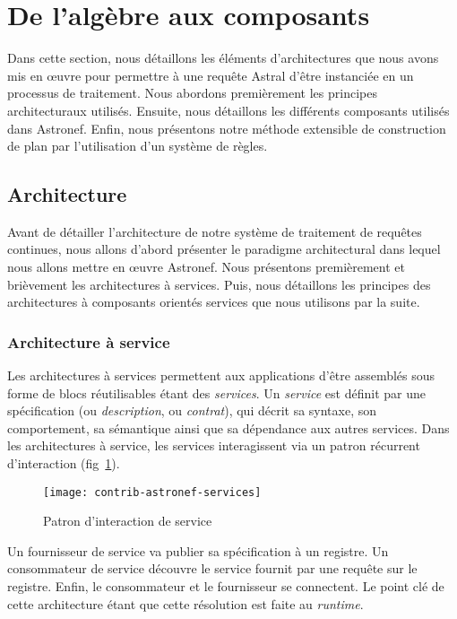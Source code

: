 \section{De l'algèbre aux composants}\label{sec:contrib:astronef:architecture}
Dans cette section, nous détaillons les éléments d'architectures que nous avons mis en œuvre pour permettre à une requête Astral d'être instanciée en un processus de traitement. Nous abordons premièrement les principes architecturaux utilisés. Ensuite, nous détaillons les différents composants utilisés dans Astronef. Enfin, nous présentons notre méthode extensible de construction de plan par l'utilisation d'un système de règles.
\subsection{Architecture}
Avant de détailler l'architecture de notre système de traitement de requêtes continues, nous allons d'abord présenter le paradigme architectural dans lequel nous allons mettre en œuvre Astronef. Nous présentons premièrement et brièvement les architectures à services. Puis, nous détaillons les principes des architectures à composants orientés services que nous utilisons par la suite.
\subsubsection{Architecture à service}
Les architectures à services permettent aux applications d'être assemblés sous forme de blocs réutilisables étant des \textit{services}. Un \textit{service} est définit par une spécification (ou \textit{description}, ou \textit{contrat}), qui décrit sa syntaxe, son comportement, sa sémantique ainsi que sa dépendance aux autres services. Dans les architectures à service, les services interagissent via un patron récurrent d'interaction (fig~\ref{fig:contrib:astronef:services}). 
\begin{figure}[ht]
    \centering
    \texttt{[image: contrib-astronef-services]}
    \caption{Patron d'interaction de service}\label{fig:contrib:astronef:services}
\end{figure}
Un fournisseur de service va publier sa spécification à un registre. Un consommateur de service découvre le service fournit par une requête sur le registre. Enfin, le consommateur et le fournisseur se connectent. Le point clé de cette architecture étant que cette résolution est faite au \textit{runtime}.


